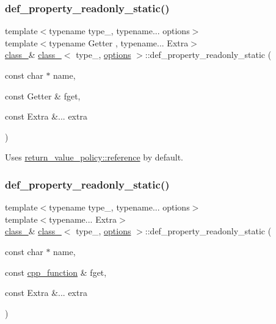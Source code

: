 \subsubsection{\texorpdfstring{def\_property\_readonly\_static()}{def\_property\_readonly\_static()}\hspace{0.1cm}{\footnotesize\ttfamily [1/2]}}
{\footnotesize\ttfamily template$<$typename type\+\_\+, typename... options$>$ \\
template$<$typename Getter , typename... Extra$>$ \\
\mbox{\hyperlink{classclass__}{class\+\_\+}}\& \mbox{\hyperlink{classclass__}{class\+\_\+}}$<$ type\+\_\+, \mbox{\hyperlink{classoptions}{options}} $>$\+::def\+\_\+property\+\_\+readonly\+\_\+static (\begin{DoxyParamCaption}\item[{const char $\ast$}]{name,  }\item[{const Getter \&}]{fget,  }\item[{const Extra \&...}]{extra }\end{DoxyParamCaption})\hspace{0.3cm}{\ttfamily [inline]}}



Uses \mbox{\hyperlink{detail_2common_8h_adde72ab1fb0dd4b48a5232c349a53841ab8af13ea9c8fe890c9979a1fa8dbde22}{return\+\_\+value\+\_\+policy\+::reference}} by default. 

\mbox{\label{classclass___a84efdefa8be30cf8fe803793474430c1}} 
\subsubsection{\texorpdfstring{def\_property\_readonly\_static()}{def\_property\_readonly\_static()}\hspace{0.1cm}{\footnotesize\ttfamily [2/2]}}
{\footnotesize\ttfamily template$<$typename type\+\_\+, typename... options$>$ \\
template$<$typename... Extra$>$ \\
\mbox{\hyperlink{classclass__}{class\+\_\+}}\& \mbox{\hyperlink{classclass__}{class\+\_\+}}$<$ type\+\_\+, \mbox{\hyperlink{classoptions}{options}} $>$\+::def\+\_\+property\+\_\+readonly\+\_\+static (\begin{DoxyParamCaption}\item[{const char $\ast$}]{name,  }\item[{const \mbox{\hyperlink{classcpp__function}{cpp\+\_\+function}} \&}]{fget,  }\item[{const Extra \&...}]{extra }\end{DoxyParamCaption})\hspace{0.3cm}{\ttfamily [inline]}}



